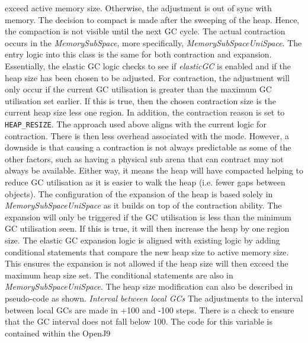 exceed active memory size. Otherwise, the adjustment is out of sync with
memory. The decision to compact is made after the sweeping of the heap.
Hence, the compaction is not visible until the next GC cycle. The actual
contraction occurs in the \emph{MemorySubSpace}, more specifically,
\emph{MemorySubSpaceUniSpace}. The entry logic into this class is the same for
both contraction and expansion. Essentially, the elastic GC logic checks
to see if \emph{elasticGC} is enabled and if the heap size has been chosen to
be adjusted. 
\newline\newline
For contraction, the adjustment will only occur if the current GC
utilisation is greater than the maximum GC utilisation set earlier. If
this is true, then the chosen contraction size is the current heap size
less one region. In addition, the contraction reason is set to \verb|HEAP_RESIZE|. The approach used above aligns with the current logic for
contraction. There is then less overhead associated with the mode.
However, a downside is that causing a contraction is not always
predictable as some of the other factors, such as having a physical sub
arena that can contract may not always be available. Either way, it
means the heap will have compacted helping to reduce GC utilisation as
it is easier to walk the heap (i.e. fewer gaps between objects). \newline\newline
The configuration of the expansion of the heap is based solely in
\emph{MemorySubSpaceUniSpace} as it builds on top of the contraction
ability. The expansion will only be triggered if the GC utilisation is
less than the minimum GC utilisation seen. If this is true, it will then
increase the heap by one region size. The elastic GC expansion logic is
aligned with existing logic by adding conditional statements that compare the new
heap size to active memory size. This ensures the expansion is not
allowed if the heap size will then exceed the maximum heap size set. The
conditional statements are also in \emph{MemorySubSpaceUniSpace}. The heap size
modification can also be described in pseudo-code as shown.
\newline\newline
\emph{Interval between local GCs}
\newline\newline
The
adjustments to the interval between local GCs are made in +100 and -100
steps. There is a check to ensure that the GC interval does not fall
below 100. The code for this variable is contained within the OpenJ9
